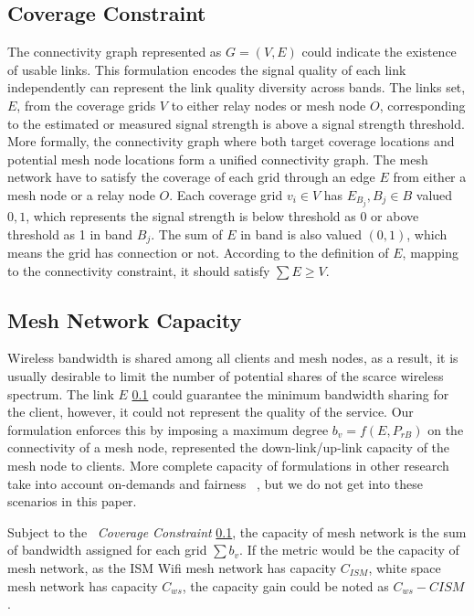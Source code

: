 \subsection{Coverage Constraint}
\label{subsec:ccconstraint}
The connectivity graph represented as $G=(V,E)$ could indicate the existence of usable links. This formulation encodes the signal quality of each link independently can represent the link quality diversity across bands.
The links set, $E$, from the coverage grids $V$ to either relay nodes or mesh node $O$, corresponding to the estimated or measured signal strength is above a signal strength threshold. 
More formally, the connectivity graph where both target coverage locations and potential mesh node locations form a unified connectivity graph.
The mesh network have to satisfy the coverage of each grid through an edge $E$ from either a mesh node or a relay node $O$.
Each coverage grid $v_i\in {V}$ has $E_{B_j},{B_j}\in {B}$ valued ${0,1}$, which represents the signal strength is below threshold as 0 or above threshold as 1 in band $B_j$.
The sum of $E$ in band is also valued $(0,1)$, which means the grid has connection or not.
According to the definition of $E$, mapping to the connectivity constraint, it should satisfy $\sum{E}\geq V$.






\subsection{Mesh Network Capacity}
Wireless bandwidth is shared among all clients and mesh nodes, as a result, it is usually desirable to limit the number of potential shares of the scarce wireless spectrum. 
The link $E$ \ref{subsec:ccconstraint} could guarantee the minimum bandwidth sharing for the client, however, it could not represent the quality of the service. Our formulation enforces this by imposing a maximum degree $b_v=f(E,P_{rB})$ on the connectivity of a mesh node, represented the down-link/up-link capacity of the mesh node to clients. More complete capacity of formulations in other research take into account on-demands and fairness ~\cite{arkoulis2013optimal}, but we do not get into these scenarios in this paper.


Subject to the ~\emph{Coverage Constraint} \ref{subsec:ccconstraint}, the capacity of mesh network is the sum of bandwidth assigned for each grid $\sum{b_v}$. If the metric would be the capacity of mesh network, as the ISM Wifi mesh network has capacity $C_{ISM}$, white space mesh network has capacity $C_{ws}$, the capacity gain could be noted as $C_{ws}-C{ISM}$.

